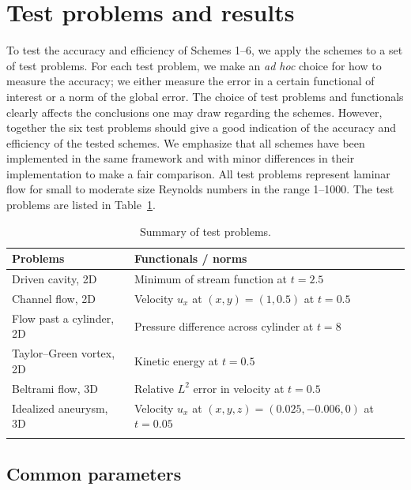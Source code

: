 \section{Test problems and results}

To test the accuracy and efficiency of Schemes 1--6, we apply the
schemes to a set of test problems. For each test problem, we make an
\emph{ad hoc} choice for how to measure the accuracy; we either
measure the error in a certain functional of interest or a norm of the
global error.  The choice of test problems and functionals clearly
affects the conclusions one may draw regarding the schemes. However,
together the six test problems should give a good indication of the
accuracy and efficiency of the tested schemes. We emphasize that all
schemes have been implemented in the same framework and with minor
differences in their implementation to make a fair comparison. All
test problems represent laminar flow for small to moderate size
Reynolds numbers in the range 1--1000. The test problems are listed in
Table~\ref{tab:problems}.

\begin{table}
  \begin{center}
    \begin{tabular}{ll}
      \hline
      Problems & Functionals / norms \\
      \hline
      Driven cavity, 2D        & Minimum of stream function at $t = 2.5$ \\
      Channel flow, 2D         & Velocity $u_x$ at $(x, y) = (1, 0.5)$ at $t = 0.5$ \\
      Flow past a cylinder, 2D & Pressure difference across cylinder at $t = 8$ \\
      Taylor--Green vortex, 2D & Kinetic energy at $t = 0.5$ \\
      Beltrami flow, 3D        & Relative $L^2$ error in velocity at $t = 0.5$ \\
      Idealized aneurysm, 3D   & Velocity $u_x$ at $(x, y, z) = (0.025, -0.006, 0)$ at $t = 0.05$ \\
      \hline
      \label{tab:problems}
    \end{tabular}
    \caption{Summary of test problems.}
  \end{center}
\end{table}

\subsection{Common parameters}

